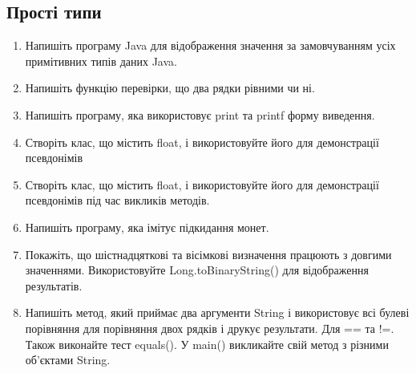 \documentclass[]{article}
\begin{document}
\subsection{Прості типи}
\begin{enumerate}
\def\labelenumi{1.\arabic{enumi}.}
\item
Напишіть програму Java для відображення значення за замовчуванням усіх примітивних типів даних Java.
\item
Напишіть функцію перевірки, що два рядки рівними чи ні.
\item
Напишіть програму, яка використовує print та printf форму виведення.
\item
Створіть клас, що містить float, і використовуйте його для демонстрації псевдонімів
\item
Створіть клас, що містить float, і використовуйте його для демонстрації псевдонімів під час викликів методів.

\item
Напишіть програму, яка імітує підкидання монет.
\item
Покажіть, що шістнадцяткові та вісімкові визначення працюють з довгими значеннями. Використовуйте Long.toBinaryString() для відображення результатів.

\item
 Напишіть метод, який приймає два аргументи String і використовує всі булеві порівняння для порівняння двох рядків і друкує результати. Для == та !=. Також виконайте тест equals(). У main() викликайте свій метод з різними об'єктами String.


\end{enumerate}
\end{document}
